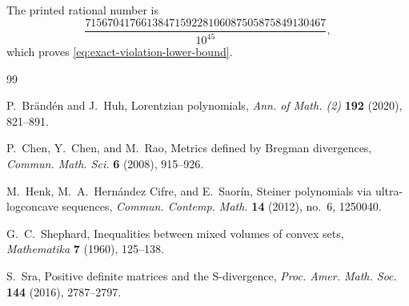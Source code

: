 \documentclass[11pt]{article}
\theoremstyle{definition}
\begin{document}
The printed rational number is
\[
 \frac{7156704176613847159228106087505875849130467}{10^{45}},
\]
which proves \eqref{eq:exact-violation-lower-bound}.

\begin{thebibliography}{99}

P.~Br\"and\'en and J.~Huh,
\newblock Lorentzian polynomials,
\newblock \emph{Ann. of Math. (2)} \textbf{192} (2020), 821--891.

P.~Chen, Y.~Chen, and M.~Rao,
\newblock Metrics defined by Bregman divergences,
\newblock \emph{Commun. Math. Sci.} \textbf{6} (2008), 915--926.

M.~Henk, M.~A.~Hern\'andez Cifre, and E.~Saor\'in,
\newblock Steiner polynomials via ultra-logconcave sequences,
\newblock \emph{Commun. Contemp. Math.} \textbf{14} (2012), no.~6, 1250040.

G.~C.~Shephard,
\newblock Inequalities between mixed volumes of convex sets,
\newblock \emph{Mathematika} \textbf{7} (1960), 125--138.

S.~Sra,
\newblock Positive definite matrices and the S-divergence,
\newblock \emph{Proc. Amer. Math. Soc.} \textbf{144} (2016), 2787--2797.

\end{thebibliography}
\end{document}
